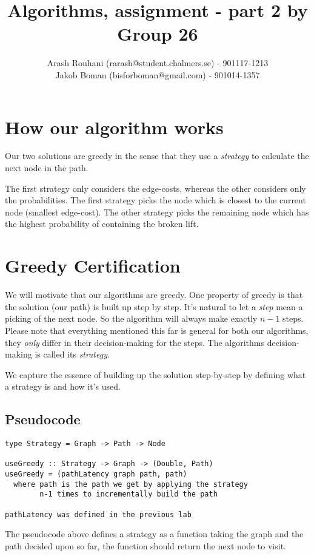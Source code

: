 \documentclass[a4paper,11pt]{article}
\title{Algorithms, assignment - part 2 by Group 26}
\author{Arash Rouhani (rarash@student.chalmers.se) - 901117-1213\\
        Jakob Boman (bisforboman@gmail.com) - 901014-1357}
\begin{document}
\maketitle

\section{How our algorithm works}
Our two solutions are greedy in the sense that they use a \emph{strategy}
to calculate the next node in the path.

The first strategy only considers the edge-costs, whereas the other considers
only the probabilities. The first strategy picks the node which is closest
to the current node (smallest edge-cost). The other strategy picks the
remaining node which has the highest probability of containing the broken lift.


\section{Greedy Certification}

We will motivate that our algorithms are greedy. One property of greedy
is that the solution (our path) is built up step by step. It's natural
to let a \emph{step} mean a picking of the next node. So the algorithm
will always make exactly $n-1$ steps. Please note that everything mentioned
this far is general for both our algorithms, they \emph{only} differ
in their decision-making for the steps. The algorithms decision-making
is called its \emph{strategy}.

We capture the essence of building up the solution step-by-step
by defining what a strategy is and how it's used.

\subsection{Pseudocode}
\begin{lstlisting}[mathescape]
type Strategy = Graph -> Path -> Node

useGreedy :: Strategy -> Graph -> (Double, Path)
useGreedy = (pathLatency graph path, path)
  where path is the path we get by applying the strategy
        n-1 times to incrementally build the path

pathLatency was defined in the previous lab

\end{lstlisting}

The pseudocode above defines a strategy as a function
taking the graph and the path decided upon so far,
the function should return the next node to visit.
\end{document}
